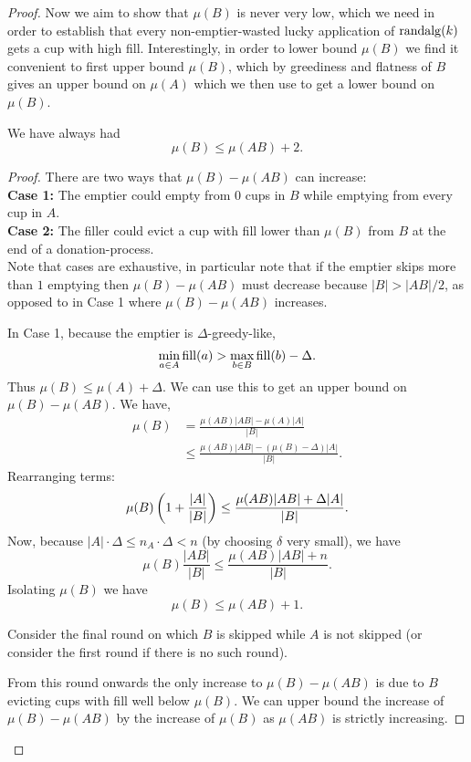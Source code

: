 \begin{proof}
Now we aim to show that $\mu(B)$ is never very low, which we need
in order to establish that every non-emptier-wasted lucky
application of $\operatorname{\text{\textup{randalg}}}(k)$ gets a cup with high fill.
Interestingly, in order to lower bound $\mu(B)$ we find it
convenient to first upper bound $\mu(B)$, which by greediness and
flatness of $B$ gives an upper bound on $\mu(A)$ which we then
use to get a lower bound on $\mu(B)$.

\begin{clm}
  \label{clm:muBdoesntgettoobig}
  We have always had
  $$\mu(B) \le \mu(AB) + 2.$$
\end{clm}
\begin{proof}
  There are two ways that $\mu(B)-\mu(A B)$ can increase: \\
  \textbf{Case 1:}
  The emptier could empty from $0$ cups in $B$ while emptying
  from every cup in $A$. \\
  \textbf{Case 2:}
  The filler could evict a cup with fill lower than $\mu(B)$ from
  $B$ at the end of a donation-process. \\

  Note that cases are exhaustive, in particular note that if the
  emptier skips more than $1$ emptying then $\mu(B) - \mu(AB)$
  must decrease because $|B| > |AB|/2$, as opposed to in Case 1
  where $\mu(B) - \mu(AB)$ increases.

  In Case 1, because the emptier is $\Delta$-greedy-like,
  $$\min_{a\in A} \operatorname{\text{\textup{fill}}}(a) > \max_{b\in B} \operatorname{\text{\textup{fill}}}(b) - \Delta.$$
  Thus $\mu(B) \le \mu(A) + \Delta$. We can use this to get an
  upper bound on $\mu(B) - \mu(AB)$. We have, 
  \begin{align*}
    \mu(B) &= \frac{\mu(AB) |AB| - \mu(A) |A|}{|B|}\\
           &\le \frac{\mu(AB) |AB| - (\mu(B) - \Delta) |A|}{|B|}.
  \end{align*}
  Rearranging terms:
  $$\mu(B) \left( 1+\frac{|A|}{|B|} \right) \le \frac{\mu(AB) |AB| + \Delta |A|}{|B|}.$$
  Now, because $|A| \cdot \Delta \le n_A
  \cdot \Delta < n$ (by choosing $\delta$ very small), we have 
  $$\mu(B) \frac{|AB|}{|B|}\le \frac{\mu(AB) |AB| + n}{|B|}.$$
  Isolating $\mu(B)$ we have 
  $$\mu(B) \le \mu(AB) + 1.$$

  Consider the final round on which $B$ is skipped while $A$ is
  not skipped (or consider the first round if there is no such
  round).

  From this round onwards the only increase to $\mu(B) - \mu(A
  B)$ is due to $B$ evicting cups with fill well below $\mu(B)$.
  We can upper bound the increase of $\mu(B) - \mu(AB)$ by the
  increase of $\mu(B)$ as $\mu(AB)$ is strictly increasing.


\end{proof}
\end{proof}
